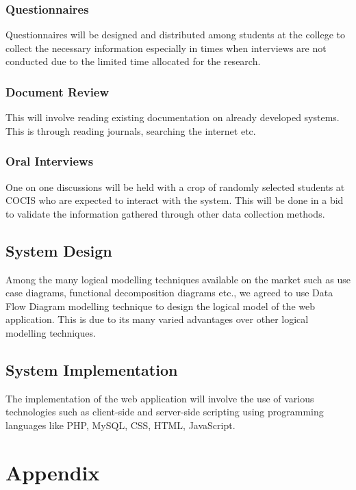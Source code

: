 \documentclass{article}
\begin{document}
\subsubsection{Questionnaires}
Questionnaires will be designed and distributed among students at the college to collect the necessary information especially in times when interviews are not conducted due to the limited time allocated for the research.

\subsubsection{Document Review}
This will involve reading existing documentation on already developed systems. This is through reading journals, searching the internet etc.

\subsubsection{Oral Interviews}
One on one discussions will be held with a crop of randomly selected students at COCIS who are expected to interact with the system. This will be done in a bid to validate the information gathered through other data collection methods.

\subsection{System Design}
Among the many logical modelling techniques available on the market such as use case diagrams, functional decomposition diagrams etc., we agreed to use Data Flow Diagram modelling technique to design the logical model of the web application. This is due to its many varied advantages over other logical modelling techniques. 

\subsection{System Implementation}
The implementation of the web application will involve the use of various technologies such as client-side and server-side scripting using programming languages like PHP, MySQL, CSS, HTML, JavaScript.



\newpage
\nocite{*}



\newpage
\section{Appendix}
\end{document}
